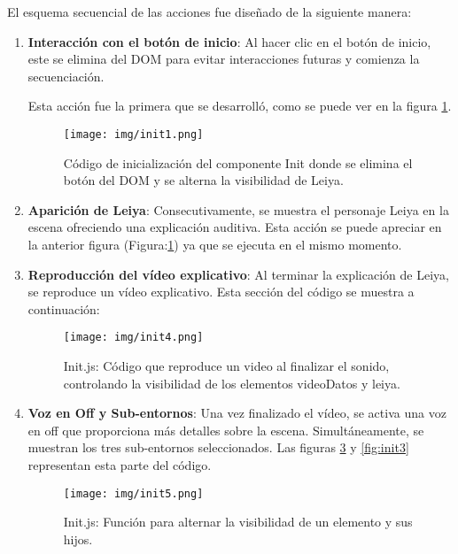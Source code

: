 \documentclass[a4paper, 12pt]{book}
\begin{document}
El esquema secuencial de las acciones fue diseñado de la siguiente manera:

\begin{enumerate}
    \item \textbf{Interacción con el botón de inicio}: Al hacer clic en el botón de inicio, este se elimina del DOM para evitar interacciones futuras y comienza la secuenciación.
    

    Esta acción fue la primera que se desarrolló, como se puede ver en la figura \ref{fig:init1}.
    \begin{figure}[H]
        \centering
        \texttt{[image: img/init1.png]}
        \caption[Inicialización de Init.js: eliminación del botón y visibilidad de Leiya.]{Código de inicialización del componente Init donde se elimina el botón del DOM y se alterna la visibilidad de Leiya.}
        \label{fig:init1}
    \end{figure}
    
    \item \textbf{Aparición de Leiya}: Consecutivamente, se muestra el personaje Leiya en la escena ofreciendo una explicación auditiva. Esta acción se puede apreciar en la anterior figura (Figura:\ref{fig:init1}) ya que se ejecuta en el mismo momento. 


    \item \textbf{Reproducción del vídeo explicativo}: Al terminar la explicación de Leiya, se reproduce un vídeo explicativo. Esta sección del código se muestra a continuación:
        \begin{figure}[H]
        \centering
        \texttt{[image: img/init4.png]}
        \caption{Init.js: Código que reproduce un video al finalizar el sonido, controlando la visibilidad de los elementos videoDatos y leiya.}

        \label{fig:enter-label}
    \end{figure}
    \item \textbf{Voz en Off y Sub-entornos}: Una vez finalizado el vídeo, se activa una voz en off que proporciona más detalles sobre la escena. Simultáneamente, se muestran los tres sub-entornos seleccionados. Las figuras \ref{fig:init5} y \ref{fig:init3} representan esta parte del código.
        \begin{figure}[H]
        \centering
        \texttt{[image: img/init5.png]}
        \caption{Init.js: Función para alternar la visibilidad de un elemento y sus hijos.}
        \label{fig:init5}
    \end{figure}
\end{enumerate}
\end{document}
